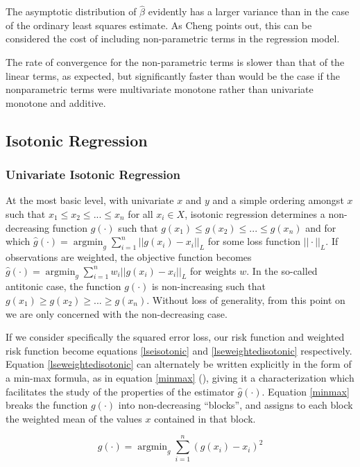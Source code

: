 \documentclass[10pt]{olplainarticle}\usepackage[]{graphicx}\usepackage[]{color}
\DeclareMathOperator*{\argmin}{argmin}
\begin{document}
The asymptotic distribution of $\hat{\beta}$ evidently has a larger variance than in the case of the ordinary least squares estimate. As Cheng points out, this can be considered the cost of including non-parametric terms in the regression model. 

The rate of convergence for the non-parametric terms is slower than that of the linear terms, as expected, but significantly faster than would be the case if the nonparametric terms were multivariate monotone rather than univariate monotone and additive. 


\subsection{Isotonic Regression}

\subsubsection{Univariate Isotonic Regression}
At the most basic level, with univariate $x$ and $y$ and a simple ordering amongst $x$ such that \( x_{1} \leq x_{2} \leq ... \leq x_{n} \) for all \( x_{i} \in X \), isotonic regression determines a non-decreasing function $g(\cdot)$ such that \( g(x_{1}) \leq g(x_{2}) \leq ... \leq g(x_{n}) \) and for which \( \hat{g}(\cdot) = \argmin_{g} \sum_{i=1}^{n}||g(x_{i}) - x_{i}||_{L} \) for some loss function $||\cdot||_{L}$. If observations are weighted, the objective function becomes \( \hat{g}(\cdot) = \argmin_{g} \sum_{i=1}^{n}w_{i}||g(x_{i}) - x_{i}||_{L} \) for weights $w$. In the so-called antitonic case, the function $g(\cdot)$ is non-increasing such that \( g(x_{1}) \geq g(x_{2}) \geq ... \geq g(x_{n}) \). Without loss of generality, from this point on we are only concerned with the non-decreasing case.

If we consider specifically the squared error loss, our risk function and weighted risk function become equations \ref{lseisotonic} and \ref{lseweightedisotonic} respectively. Equation \ref{lseweightedisotonic} can alternately be written explicitly in the form of a min-max formula, as in equation \ref{minmax} (\cite{jordan}), giving it a characterization which facilitates the study of the properties of the estimator $\hat{g}(\cdot)$. Equation \ref{minmax} breaks the function $g(\cdot)$ into non-decreasing ``blocks'', and assigns to each block the weighted mean of the values $x$ contained in that block.


\begin{equation} \label{lseisotonic}
  \hat{g}(\cdot) = \argmin_{g} \sum_{i=1}^{n}(g(x_{i}) - x_{i})^2
\end{equation}
\end{document}
